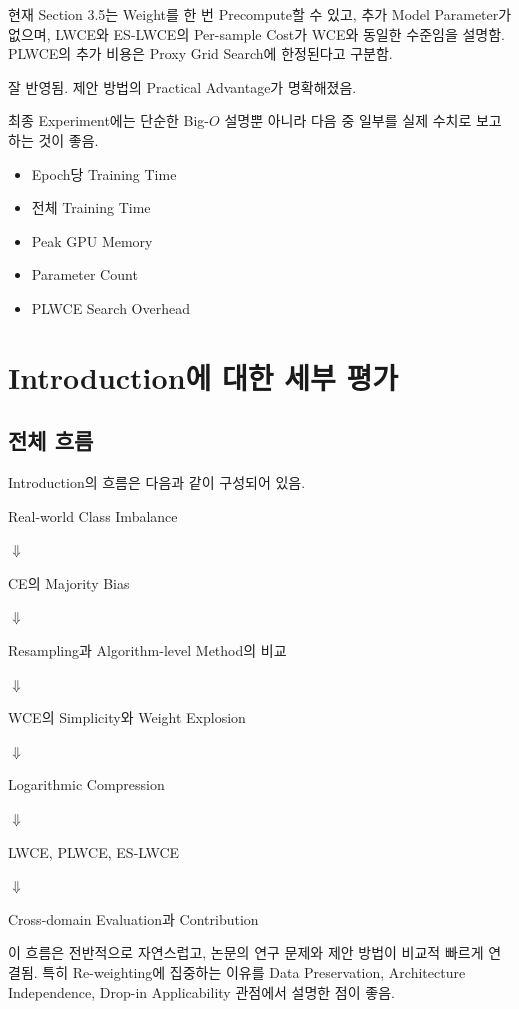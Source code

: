 \documentclass[11pt,a4paper]{article}
\begin{document}
현재 Section 3.5는 Weight를 한 번 Precompute할 수 있고, 추가 Model Parameter가 없으며, LWCE와 ES-LWCE의 Per-sample Cost가 WCE와 동일한 수준임을 설명함. PLWCE의 추가 비용은 Proxy Grid Search에 한정된다고 구분함.

\begin{tcolorbox}[title=반영 평가]
잘 반영됨. 제안 방법의 Practical Advantage가 명확해졌음.
\end{tcolorbox}

최종 Experiment에는 단순한 Big-\(O\) 설명뿐 아니라 다음 중 일부를 실제 수치로 보고하는 것이 좋음.

\begin{itemize}
\item Epoch당 Training Time
\item 전체 Training Time
\item Peak GPU Memory
\item Parameter Count
\item PLWCE Search Overhead
\end{itemize}

\section{Introduction에 대한 세부 평가}

\subsection{전체 흐름}

Introduction의 흐름은 다음과 같이 구성되어 있음.

\begin{center}
Real-world Class Imbalance

$\Downarrow$

CE의 Majority Bias

$\Downarrow$

Resampling과 Algorithm-level Method의 비교

$\Downarrow$

WCE의 Simplicity와 Weight Explosion

$\Downarrow$

Logarithmic Compression

$\Downarrow$

LWCE, PLWCE, ES-LWCE

$\Downarrow$

Cross-domain Evaluation과 Contribution
\end{center}

이 흐름은 전반적으로 자연스럽고, 논문의 연구 문제와 제안 방법이 비교적 빠르게 연결됨. 특히 Re-weighting에 집중하는 이유를 Data Preservation, Architecture Independence, Drop-in Applicability 관점에서 설명한 점이 좋음.
\end{document}
